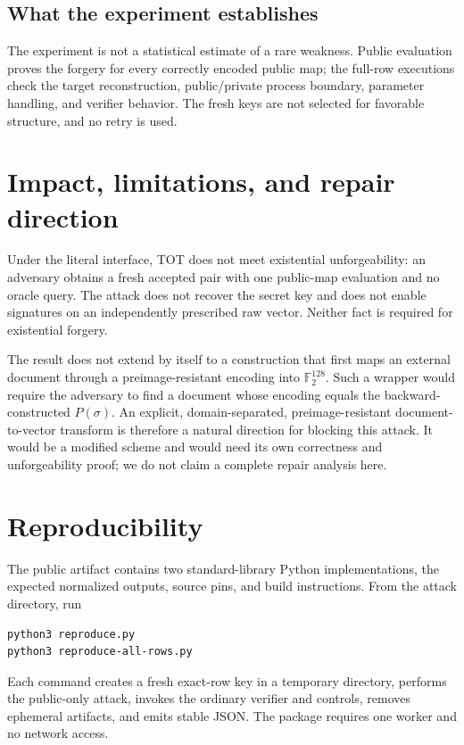\documentclass[10pt,a4paper]{article}
\newcommand{\F}{\mathbb F}
\begin{document}
\subsection{What the experiment establishes}

The experiment is not a statistical estimate of a rare weakness.  Public
evaluation proves the forgery for every correctly encoded public map; the
full-row executions check the target reconstruction, public/private process
boundary, parameter handling, and verifier behavior.  The fresh keys are not
selected for favorable structure, and no retry is used.

\section{Impact, limitations, and repair direction}

Under the literal interface, TOT does not meet existential unforgeability:
an adversary obtains a fresh accepted pair with one public-map evaluation and
no oracle query.  The attack does not recover the secret key and does not
enable signatures on an independently prescribed raw vector.  Neither fact
is required for existential forgery.

The result does not extend by itself to a construction that first maps an
external document through a preimage-resistant encoding into
$\F_2^{128}$.  Such a wrapper would require the adversary to find a document
whose encoding equals the backward-constructed $P(\sigma)$.  An explicit,
domain-separated, preimage-resistant document-to-vector transform is
therefore a natural direction for blocking this attack.  It would be a
modified scheme and would need its own correctness and unforgeability proof;
we do not claim a complete repair analysis here.

\section{Reproducibility}

The public artifact contains two standard-library Python implementations,
the expected normalized outputs, source pins, and build instructions.  From
the attack directory, run
\begin{verbatim}
python3 reproduce.py
python3 reproduce-all-rows.py
\end{verbatim}
Each command creates a fresh exact-row key in a temporary directory, performs
the public-only attack, invokes the ordinary verifier and controls, removes
ephemeral artifacts, and emits stable JSON.  The package requires one worker
and no network access.
\end{document}
